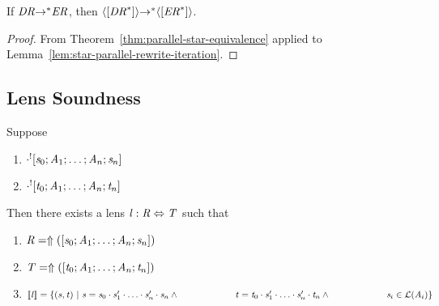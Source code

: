 \documentclass[numbers,10pt,preprint\ifanon ,nocopyrightspace\fi]{sigplanconf}
\begin{document}
\begin{corollary}
  \label{cor:rewrite-maintained-iteration}
  If $\mathit{DR} {\rightarrow}^* \mathit{ER}$, then
  $\langle[{\mathit{DR}}^*]\rangle {\ensuremath{\rightarrow}}^*
  \langle[{\mathit{ER}}^*]\rangle$.
\end{corollary}
\begin{proof}
  From Theorem~\ref{thm:parallel-star-equivalence} applied to
  Lemma~\ref{lem:star-parallel-rewrite-iteration}.
\end{proof}

\subsection{Lens Soundness}
\begin{lemma}
  \label{lem:boilerplate-alterations}
  Suppose
  \begin{enumerate}
  \item $\cdot^![\mathit{s}_0;\mathit{A}_1;\ldots;\mathit{A}_n;\mathit{s}_n]$
  \item $\cdot^![\mathit{t}_0;\mathit{A}_1;\ldots;\mathit{A}_n;\mathit{t}_n]$
  \end{enumerate}
  Then there exists a lens
  $\mathit{l} : \mathit{R} \Leftrightarrow \mathit{T}$ such that
  \begin{enumerate}
  \item $\mathit{R} = \Uparrow([\mathit{s}_0;\mathit{A}_1;\ldots;\mathit{A}_n;\mathit{s}_n])$
  \item $\mathit{T} = \Uparrow([\mathit{t}_0;\mathit{A}_1;\ldots;\mathit{A}_n;\mathit{t}_n])$
  \item $[ \! [\mathit{l}] \! ]=\{(\mathit{s},\mathit{t})~|~
      \mathit{s}=\mathit{s}_0\cdot\mathit{s}_1'\cdot\ldots\cdot\mathit{s}_n'\cdot\mathit{s}_n
      \wedge\\
      \hspace*{6.1em}\mathit{t}=\mathit{t}_0\cdot\mathit{s}_1'\cdot\ldots\cdot\mathit{s}_n'\cdot\mathit{t}_n
      \wedge\\
      \hspace*{6.1em}\mathit{s}_i\in\mathcal{L}(\mathit{A}_i)\}$
  \end{enumerate}
\end{lemma}
\end{document}
